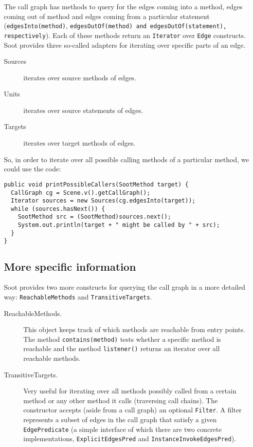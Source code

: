\documentclass{article}
\newcommand{\code}[1]{\texttt{\small #1}}
\begin{document}
The call graph has methods to query for the edges coming into a
method, edges coming out of method and edges coming from a particular
statement (\code{edgesInto(method)}, \code{edgesOutOf(method) and \-
edgesOutOf(statement), respec\-tively}). Each of these methods
return an \code{Iterator} over \code{Edge} constructs. Soot provides
three so-called adapters for iterating over specific parts of an
edge.
\begin{description}
\item[Sources] iterates over source methods of edges.
\item[Units] iterates over source statements of edges.
\item[Targets] iterates over target methods of edges.
\end{description}
So, in order to iterate over all possible calling methods of a
particular method, we could use the code:
\begin{center}
  \begin{minipage}{0.9 \linewidth}
\begin{verbatim}
public void printPossibleCallers(SootMethod target) {
  CallGraph cg = Scene.v().getCallGraph();
  Iterator sources = new Sources(cg.edgesInto(target));
  while (sources.hasNext()) {
    SootMethod src = (SootMethod)sources.next();
    System.out.println(target + " might be called by " + src);
  }
}
\end{verbatim}
  \end{minipage}
\end{center}

\subsection{More specific information}

Soot provides two more constructs for querying the call graph in a
more detailed way: \code{ReachableMethods} and
\code{TransitiveTargets}.
\begin{description}
\item[ReachableMethods.] This object keeps track of which methods are
  reachable from entry points. The method \code{contains(method)}
  tests whether a specific method is reachable and the method
  \code{listener()} returns an iterator over all reachable methods.
\item[TransitiveTargets.] Very useful for iterating over all methods
  possibly called from a certain method or any other method it calls
  (traversing call chains). The constructor accepts (aside from a call
  graph) an optional \code{Filter}. A filter represents a subset of
  edges in the call graph that satisfy a given \code{EdgePredicate} (a
  simple interface of which there are two concrete implementations,
  \code{ExplicitEdgesPred} and \code{InstanceInvokeEdgesPred}).
\end{description}
\end{document}
